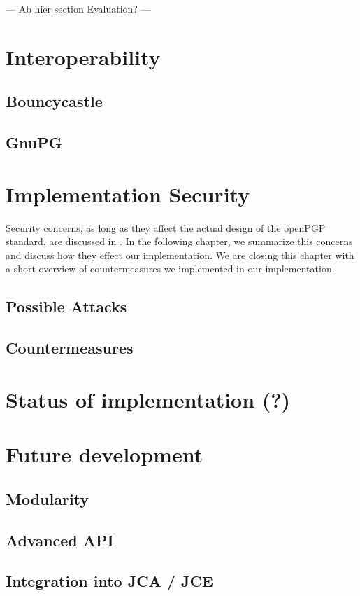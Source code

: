 --- Ab hier section Evaluation? ---

\section{Interoperability}

\subsection{Bouncycastle}

\subsection{GnuPG}


\section{Implementation Security}

Security concerns, as long as they affect the actual design of the openPGP standard, are discussed in \citep[section 14]{RFC4880}. In the following chapter, we summarize this concerns and discuss how they effect our implementation. We are closing this chapter with a short overview of countermeasures we implemented in our implementation.

\subsection{Possible Attacks}


\subsection{Countermeasures}


\section{Status of implementation (?)}


\section{Future development}

\subsection{Modularity}

\subsection{Advanced API}

\subsection{Integration into JCA / JCE}